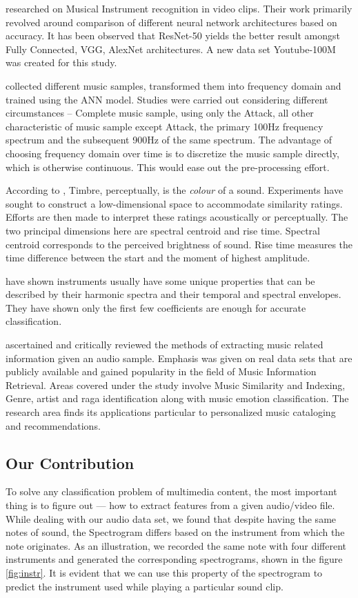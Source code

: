 \documentclass[conference]{IEEEtran}
\begin{document}
\citet{hershey2017cnn} researched on Musical Instrument recognition in video clips. Their work primarily revolved around comparison of different neural network architectures based on accuracy. It has been observed that ResNet-50 yields the better result amongst Fully Connected, VGG, AlexNet architectures. A new data set Youtube-100M was created for this study.

\citet{toghiani2017musical} collected different music samples, transformed them into frequency domain and trained using the ANN model. Studies were carried out considering different circumstances – Complete music sample, using only the Attack, all other characteristic of music sample except Attack, the primary 100Hz frequency spectrum and the subsequent 900Hz of the same spectrum. The advantage of choosing frequency domain over time is to discretize the music sample directly, which is otherwise continuous. This would ease out the pre-processing effort.

According to \citet{Eronen2000}, Timbre, perceptually, is the \textit{colour} of a sound. Experiments have sought to construct a low-dimensional space to accommodate similarity ratings. Efforts are then made to interpret these ratings acoustically or perceptually.
The two principal dimensions here are spectral centroid and rise time. Spectral centroid corresponds to the perceived brightness of sound. Rise time measures the time difference between the start and the moment of highest amplitude.

\citet{deng2008study} have shown instruments usually have some unique properties that can be described by their harmonic spectra and their temporal and spectral envelopes. They have shown only the first few coefficients are enough for accurate classification.


\citet{murthy2018content} ascertained and critically reviewed the methods of extracting music related information given an audio sample. Emphasis was given on real data sets that are publicly available and gained popularity in the field of Music Information Retrieval. Areas covered under the study involve Music Similarity and Indexing, Genre, artist and raga identification along with music emotion classification. The research area finds its applications particular to personalized music cataloging and recommendations.


\subsection{Our Contribution}
To solve any classification problem of multimedia content, the most important thing is to figure out --- how to extract features from a given audio/video file. While dealing with our audio data set, we found that despite having the same notes of sound, the Spectrogram differs based on the instrument from which the note originates. As an illustration, we recorded the same note with four different instruments and generated the corresponding spectrograms, shown in the figure \ref{fig:instr}. It is evident that we can use this property of the spectrogram to predict the instrument used while playing a particular sound clip.
\end{document}
